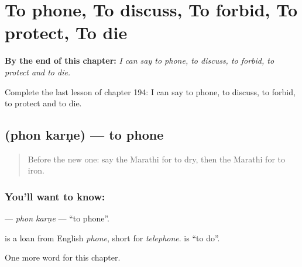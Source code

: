 
\chapter{To phone, To discuss, To forbid, To protect, To die}
\label{ch:mr-to-phone-to-discuss-to-forbid-to-protect-to-die}

\begin{chapteropening}
\textbf{By the end of this chapter:} \emph{I can say to phone, to discuss, to forbid, to protect and to die.}

Complete the last lesson of chapter 194: I can say to phone, to discuss, to forbid, to protect and to die.
\end{chapteropening}

\section[\texorpdfstring{\mr{फोन} \mr{करणे} (phon karṇe)}{फोन करणे (phon karṇe)}]{  (phon karṇe) — to phone}

\label{lesson:MR-C194-phon-karne}



\begin{quote}
Before the new one: say the Marathi for to dry, then the Marathi for to iron.
\end{quote}

\subsection*{You'll want to know:  }
\textbf{ } — \emph{phon karṇe} — \textquotedblleft{}to phone\textquotedblright{}.

\begin{cousinweb}
\textbf{} is a loan from English \emph{phone}, short for \emph{telephone}. \textbf{} is \textquotedblleft{}to do\textquotedblright{}.
\end{cousinweb}

\begin{grammarlens}[title={What you've built}]
One more word for this chapter.
\end{grammarlens}

